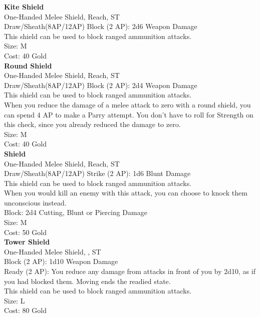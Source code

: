 \textbf{Kite Shield}\label{weapon:kiteShield}\\
One-Handed Melee Shield,  Reach, ST\\
Draw/Sheath(8AP/12AP)
Block (2 AP): 2d6 Weapon Damage\\
This shield can be used to block ranged ammunition attacks.\\
Size: M\\
Cost: 40 Gold\\

\textbf{Round Shield}\label{weapon:roundShield}\\
One-Handed Melee Shield,  Reach, ST\\
Draw/Sheath(8AP/12AP)
Block (2 AP): 2d4 Weapon Damage\\
This shield can be used to block ranged ammunition attacks.\\
When you reduce the damage of a melee attack to zero with a round shield, you can spend 4 AP to make a Parry attempt.
You don't have to roll for Strength on this check, since you already reduced the damage to zero.\\
Size: M\\
Cost: 40 Gold\\

\textbf{Shield}\label{weapon:shield}\\
One-Handed Melee Shield,  Reach, ST\\
Draw/Sheath(8AP/12AP)
Strike (2 AP): 1d6 Blunt Damage\\
This shield can be used to block ranged ammunition attacks.\\
When you would kill an enemy with this attack, you can choose to knock them unconscious instead.\\
Block: 2d4 Cutting, Blunt or Piercing Damage\\
Size: M\\
Cost: 50 Gold\\

\textbf{Tower Shield}\label{weapon:towerShield}\\
One-Handed Melee Shield, , ST\\
Block (2 AP): 1d10 Weapon Damage\\
Ready (2 AP): You reduce any damage from attacks in front of you by 2d10, as if you had blocked them. Moving ends the readied state.\\
This shield can be used to block ranged ammunition attacks.\\
Size: L\\
Cost: 80 Gold\\


